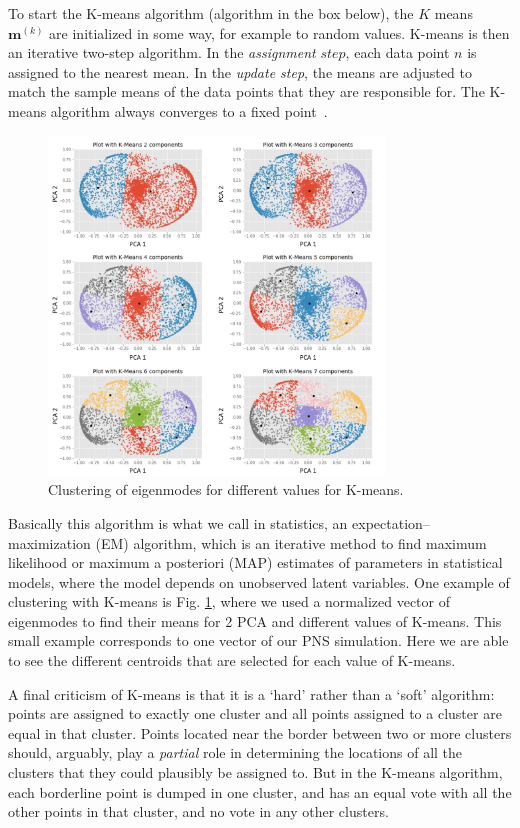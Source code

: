 \documentclass[fleqn,usenatbib]{mnras}
\begin{document}
To start the K-means algorithm (algorithm in the box below), the $K$ means ${\textbf{m}^{(k)}}$ are initialized in some way, for example to random values. K-means is then an iterative two-step algorithm. In the {\it assignment} $step$, each data point $n$ is assigned to the nearest mean. In the {\it update step}, the means are adjusted to match the sample means of the data points that they are responsible for. The K-means algorithm always converges to a fixed point~\cite{}.

\begin{figure}

\includegraphics[height=9cm]{Collage_Kmeans_color.jpg}
\caption{\label{fig:collage} Clustering of eigenmodes for different values for K-means.}
\end{figure}

Basically this algorithm is what we call in statistics, an expectation–maximization (EM) algorithm, which is an iterative method to find maximum likelihood or maximum a posteriori (MAP) estimates of parameters in statistical models, where the model depends on unobserved latent variables. One example of clustering with K-means is Fig. \ref{fig:collage}, where we used a normalized vector of eigenmodes to find their means for 2 PCA and different values of K-means. This small example corresponds to one  vector of our PNS simulation. Here we are able to see the different centroids that are selected for each value of K-means. 


A final criticism of K-means is that it is a `hard' rather than a `soft' algorithm: points are assigned to exactly one cluster and all points assigned to a cluster are equal in that cluster. Points located near the border between two or more clusters should, arguably, play a {\it partial} role in determining the locations of all the clusters that they could plausibly be assigned to. But in the K-means algorithm, each borderline point is dumped in one cluster, and has an equal vote with all the other points in that cluster, and no vote in any other clusters.
\end{document}
